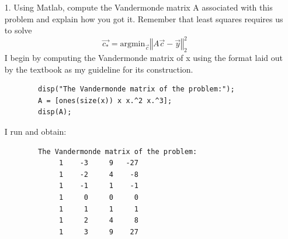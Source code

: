 \documentclass{article}
\begin{document}
\begin{itemize}
    \item[1.] Using Matlab, compute the Vandermonde matrix A associated with this problem and explain how you got it. Remember that least squares requires us to solve
    \[\overrightarrow{c_*} = \text{argmin}_{\overrightarrow{c}}\left\Vert A\overrightarrow{c}-\overrightarrow{y}\right\Vert^2_2\]
    \newline\newline
    I begin by computing the Vandermonde matrix of x using the format laid out by the textbook as my guideline for its construction. 
    \begin{verbatim}
        disp("The Vandermonde matrix of the problem:");
        A = [ones(size(x)) x x.^2 x.^3];
        disp(A);
    \end{verbatim}
    I run and obtain:
    \begin{verbatim}
        The Vandermonde matrix of the problem:
             1    -3     9   -27
             1    -2     4    -8
             1    -1     1    -1
             1     0     0     0
             1     1     1     1
             1     2     4     8
             1     3     9    27
    \end{verbatim}
    

\end{itemize}
\end{document}
